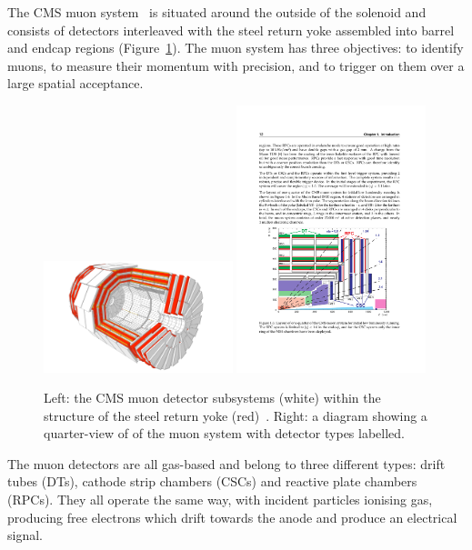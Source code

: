 The CMS muon system~\cite{cmsMuon} is situated around the outside of the solenoid and consists of detectors interleaved with the steel return yoke assembled into barrel and endcap regions (Figure~\ref{fig:apparatus:muon}).
The muon system has three objectives: to identify muons, to measure their momentum with precision, and to trigger on them over a large spatial acceptance. 
\begin{figure}[h!]
    \begin{center}
        \includegraphics[width=0.49\textwidth]{figures/apparatus/MUON.pdf}
        \includegraphics[width=0.49\textwidth]{figures/apparatus/muon_diagram.pdf}
    \end{center}
    \caption{Left: the CMS muon detector subsystems (white) within the structure of the steel return yoke (red)~\cite{SketchupCMS}. Right: a diagram showing a quarter-view of of the muon system with detector types labelled.}
    \label{fig:apparatus:muon}
\end{figure}
The muon detectors are all gas-based and belong to three different types: drift tubes (DTs), cathode strip chambers (CSCs) and reactive plate chambers (RPCs). They all operate the same way, with incident particles ionising gas, producing free electrons which drift towards the anode and produce an electrical signal. 

